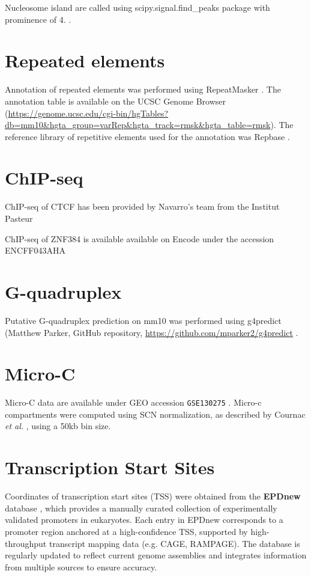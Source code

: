 \documentclass[11pt]{book}
\begin{document}
Nucleosome island are called using scipy.signal.find\_peaks package with prominence of 4. \cite{2020SciPy-NMeth}.

\section{Repeated elements}
Annotation of repeated elements was performed using RepeatMasker \cite{smit_afa_hubley_r_green_p_repeatmasker_1996}.  The annotation table is available on the UCSC Genome Browser (\url{https://genome.ucsc.edu/cgi-bin/hgTables?db=mm10&hgta_group=varRep&hgta_track=rmsk&hgta_table=rmsk}). The reference library of repetitive elements used for the annotation was Repbase \cite{bao_repbase_2015}.

\section{ChIP-seq}
ChIP-seq of CTCF has been provided by Navarro's team from the Institut Pasteur\cite{festuccia_transcription_2019, owens_ctcf_2019}

ChIP-seq of ZNF384 is available available on Encode under the accession ENCFF043AHA

\section{G-quadruplex}
Putative G-quadruplex prediction on mm10 was performed using g4predict (Matthew Parker, GitHub repository, \url{https://github.com/mparker2/g4predict} \cite{g4predict}.

\section{Micro-C}
Micro-C data are available under GEO accession \texttt{GSE130275} \cite{hsieh_resolving_2020}. Micro-c compartments were computed using SCN normalization, as described by Cournac \textit{et al.} \cite{cournac_normalization_2012}, using a 50kb bin size.

\section{Transcription Start Sites}
Coordinates of transcription start sites (TSS) were obtained from the \textbf{EPDnew} database \cite{dreos_eukaryotic_2017}, which provides a manually curated collection of experimentally validated promoters in eukaryotes. Each entry in EPDnew corresponds to a promoter region anchored at a high-confidence TSS, supported by high-throughput transcript mapping data (e.g. CAGE, RAMPAGE). The database is regularly updated to reflect current genome assemblies and integrates information from multiple sources to ensure accuracy.  
\end{document}

